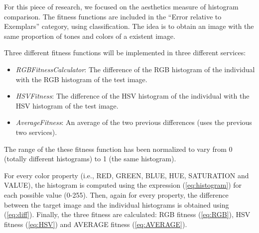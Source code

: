 

For this piece of research, we focused on the aesthetics measure of
histogram comparison. The fitness functions are included in the
``Error relative to Exemplars'' category, using 
\cite{galanter2012computational} classification. The idea is to obtain
an image with the same proportion of tones and colors of a 
existent image. 


Three different fitness functions will be implemented in three different services:
\begin{itemize}
\item {\em RGBFitnessCalculator}: The difference of the RGB histogram of the individual with the RGB histogram of the test image.
\item {\em HSVFitness}: The difference of the HSV histogram of the individual with the HSV histogram of the test image.
\item {\em AverageFitness}: An average of the two previous differences (uses the previous two services).
\end{itemize}

The range of the these fitness function has been normalized to vary from 0 (totally different histograms) to 1 (the same histogram).

For every color property (i.e., RED, GREEN, BLUE, HUE, SATURATION and VALUE), the histogram is computed using the expression (\ref{eq:histogram}) for each possible value (0-255). Then, again for every property, the difference between the target image and the individual histograms is obtained using (\ref{eq:diff}). Finally, the three fitness are calculated: RGB fitness (\ref{eq:RGB}), HSV fitness (\ref{eq:HSV}) and AVERAGE fitness (\ref{eq:AVERAGE}).

